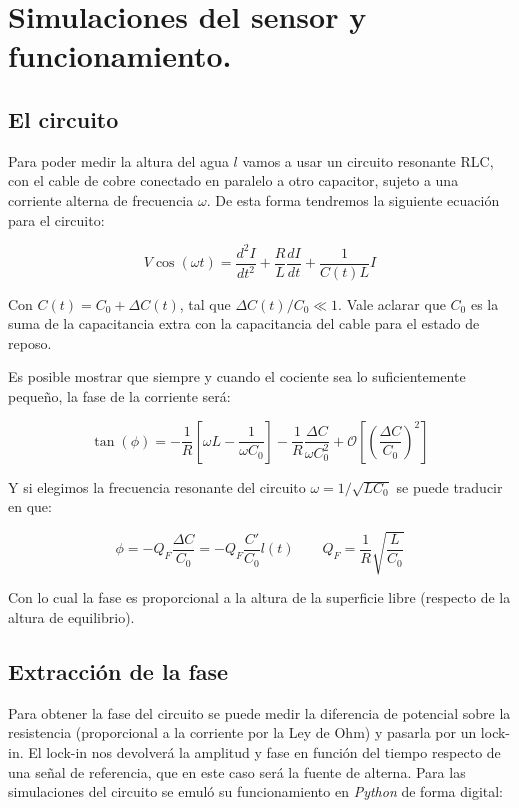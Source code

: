 \section{Simulaciones del sensor y funcionamiento.}
\subsection*{El circuito}
Para poder medir la altura del agua $l$ vamos a usar un circuito resonante RLC, con el cable de cobre conectado en paralelo a otro capacitor, sujeto a una corriente alterna de frecuencia $\omega$. De esta forma tendremos la siguiente ecuación para el circuito:

\begin{equation}
	V \cos(\omega t) = \frac{d^2I}{dt^2} + \frac{R}{L} \frac{dI}{dt} + \frac{1}{C(t)L} I
\end{equation}

Con $C(t) = C_0 + \Delta C(t)$, tal que $\Delta C(t)/C_0 \ll 1$. Vale aclarar que $C_0$ es la suma de la capacitancia extra con la capacitancia del cable para el estado de reposo.

Es posible mostrar que siempre y cuando el cociente sea lo suficientemente pequeño, la fase de la corriente será:

\begin{equation}
	\tan(\phi) = -\frac{1}{R} \left[\omega L - \frac{1}{\omega C_0}\right] - \frac{1}{R} \frac{\Delta C}{\omega C_0^2} + \mathcal{O}\left[\left(\frac{\Delta C}{C_0}\right)^2\right] 
\end{equation}

Y si elegimos la frecuencia resonante del circuito $\omega = 1/\sqrt{LC_0}$ se puede traducir en que:

\begin{equation}
	\phi = -Q_F  \frac{\Delta C}{C_0} = - Q_F \frac{C'}{C_0} l(t) \qquad Q_F = \frac{1}{R}\sqrt{\frac{L}{C_0}}
\end{equation}

Con lo cual la fase es proporcional a la altura de la superficie libre (respecto de la altura de equilibrio).

\subsection*{Extracción de la fase}
Para obtener la fase del circuito se puede medir la diferencia de potencial sobre la resistencia (proporcional a la corriente por la Ley de Ohm) y pasarla por un lock-in. El lock-in nos devolverá la amplitud y fase en función del tiempo respecto de una señal de referencia, que en este caso será la fuente de alterna. Para las simulaciones del circuito se emuló su funcionamiento en \textit{Python} de forma digital:


